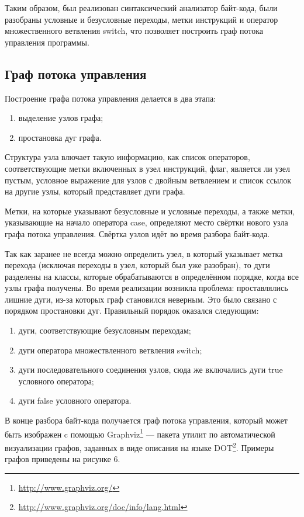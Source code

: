 Таким образом, был реализован синтаксический анализатор байт-кода, были разобраны условные и безусловные переходы, метки инструкций и оператор множественного ветвления switch, что позволяет построить граф потока управления программы. 

\newpage
\subsection{Граф потока управления}
Построение графа потока управления делается в два этапа:
\begin{enumerate}
\item выделение узлов графа;
\item простановка дуг графа.
\end{enumerate}

Структура узла влючает такую информацию, как список операторов, соответствующие метки включенных в узел инструкций, флаг, является ли узел пустым, условное выражение для узлов с двойным ветвлением и список ссылок на другие узлы, который представляет дуги графа.

Метки, на которые указывают безусловные и условные переходы, а также метки, указывающие на начало оператора case, определяют место свёртки нового узла графа потока управления. Свёртка узлов идёт во время разбора байт-кода.

Так как заранее не всегда можно определить узел, в который указывает метка перехода (исключая переходы в узел, который был уже разобран), то дуги разделены на классы, которые обрабатываются в определённом порядке, когда все узлы графа получены. Во время реализации возникла проблема: проставлялись лишние дуги, из-за которых граф становился неверным. Это было связано с порядком простановки дуг. Правильный порядок оказался следующим:
\begin{enumerate}
\item дуги, соответствующие безусловным переходам;
\item дуги оператора множествленного ветвления switch;
\item дуги последовательного соединения узлов, сюда же включались дуги true условного оператора;
\item дуги false условного оператора.
\end{enumerate}

В конце разбора байт-кода получается граф потока управления, который может быть изображен c помощью Graphviz\footnote{\url{http://www.graphviz.org/}} --- пакета утилит по автоматической визуализации графов, заданных в виде описания на языке DOT\footnote{\url{http://www.graphviz.org/doc/info/lang.html}}.
Примеры графов приведены на рисунке 6.

